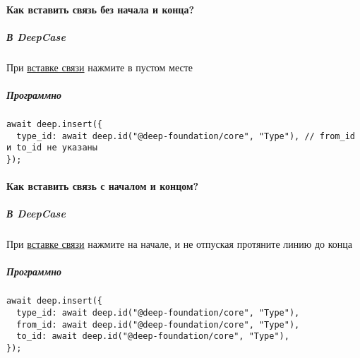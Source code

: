 \paragraph{Как вставить связь без начала и
      конца?}\hypertarget{FAQ.HowToInsertLinkWithoutFromAndTo}{}
\subparagraph{В DeepCase}
При \hyperlink{DeepCase.InsertLink.Description}{вставке связи} нажмите в пустом
месте
\subparagraph{Программно}
\begin{verbatim}
await deep.insert({
  type_id: await deep.id("@deep-foundation/core", "Type"), // from_id и to_id не указаны
});
\end{verbatim}
\paragraph{Как вставить связь с началом и
      концом?}\hypertarget{FAQ.HowToInsertLinkWithFromAndTo}{}
\subparagraph{В DeepCase}
При \hyperlink{DeepCase.InsertLink.Description}{вставке связи} нажмите на
начале, и не отпуская протяните линию до конца
\subparagraph{Программно}
\begin{verbatim}
await deep.insert({
  type_id: await deep.id("@deep-foundation/core", "Type"),
  from_id: await deep.id("@deep-foundation/core", "Type"),
  to_id: await deep.id("@deep-foundation/core", "Type"),
});
\end{verbatim}
